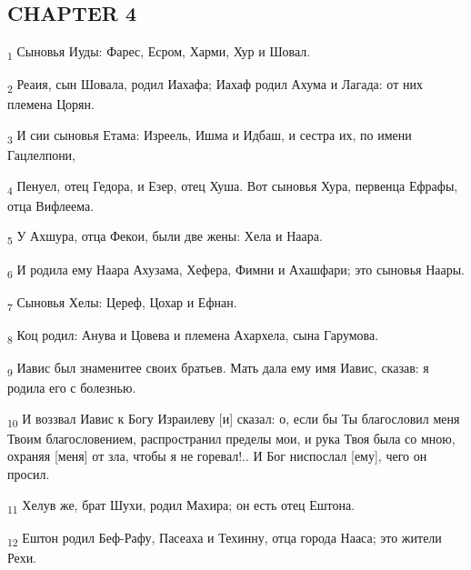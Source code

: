 \subsection{CHAPTER 4}
\begin{tcolorbox}
\textsubscript{1} Сыновья Иуды: Фарес, Есром, Харми, Хур и Шовал.
\end{tcolorbox}
\begin{tcolorbox}
\textsubscript{2} Реаия, сын Шовала, родил Иахафа; Иахаф родил Ахума и Лагада: от них племена Цорян.
\end{tcolorbox}
\begin{tcolorbox}
\textsubscript{3} И сии сыновья Етама: Изреель, Ишма и Идбаш, и сестра их, по имени Гацлелпони,
\end{tcolorbox}
\begin{tcolorbox}
\textsubscript{4} Пенуел, отец Гедора, и Езер, отец Хуша. Вот сыновья Хура, первенца Ефрафы, отца Вифлеема.
\end{tcolorbox}
\begin{tcolorbox}
\textsubscript{5} У Ахшура, отца Фекои, были две жены: Хела и Наара.
\end{tcolorbox}
\begin{tcolorbox}
\textsubscript{6} И родила ему Наара Ахузама, Хефера, Фимни и Ахашфари; это сыновья Наары.
\end{tcolorbox}
\begin{tcolorbox}
\textsubscript{7} Сыновья Хелы: Цереф, Цохар и Ефнан.
\end{tcolorbox}
\begin{tcolorbox}
\textsubscript{8} Коц родил: Анува и Цовева и племена Ахархела, сына Гарумова.
\end{tcolorbox}
\begin{tcolorbox}
\textsubscript{9} Иавис был знаменитее своих братьев. Мать дала ему имя Иавис, сказав: я родила его с болезнью.
\end{tcolorbox}
\begin{tcolorbox}
\textsubscript{10} И воззвал Иавис к Богу Израилеву [и] сказал: о, если бы Ты благословил меня Твоим благословением, распространил пределы мои, и рука Твоя была со мною, охраняя [меня] от зла, чтобы я не горевал!.. И Бог ниспослал [ему], чего он просил.
\end{tcolorbox}
\begin{tcolorbox}
\textsubscript{11} Хелув же, брат Шухи, родил Махира; он есть отец Ештона.
\end{tcolorbox}
\begin{tcolorbox}
\textsubscript{12} Ештон родил Беф-Рафу, Пасеаха и Техинну, отца города Нааса; это жители Рехи.
\end{tcolorbox}
